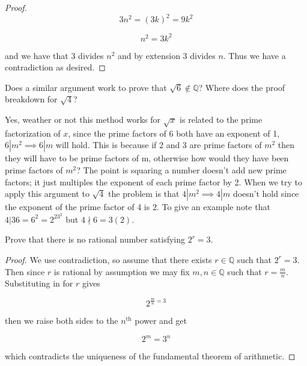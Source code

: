 \documentclass[11pt,largemargins]{homework}
\newcommand{\Q}{\mathbb{Q}}
\begin{document}
\begin{alphaparts}
\begin{proof}
                \begin{equation}
                     3n^2 = (3k)^2 = 9k^2
                \end{equation}
                
                \begin{equation}
                     n^2 = 3k^2 
                \end{equation}
                
                and we have that 3 divides $n^2$ and by extension 3 divides $n$. Thus we have a contradiction as desired.  
            \end{proof}
        \questionpart
            Does a similar argument work to prove that $\sqrt{6} \notin \Q$? Where does the proof breakdown for $\sqrt{4}$?
            
                Yes, weather or not this method works for $\sqrt{x}$ is related to the prime factorization of $x$, since the prime factors of 6 both have an exponent of 1, $6|m^2 \implies 6|m$ will hold. This is because if 2 and 3 are prime factors of $m^2$ then they will have to be prime factors of m, otherwise how would they have been prime factors of $m^2$? The point is squaring a number doesn't add new prime factors; it just multiples the exponent of each prime factor by 2. When we try to apply this argument to $\sqrt{4}$ the problem is that $4|m^2 \implies 4|m$ doesn't hold since the exponent of the prime factor of 4 is 2. To give an example note that $4|36 = 6^2 = 2^23^2$ but $4\nmid 6 = 3 (2) $. 
    \end{alphaparts}
    
    \question
    Prove that there is no rational number satisfying $2^r = 3$. 
    
    \begin{proof}
    We use contradiction, so assume that there exists $r \in \Q$ such that $2^r = 3$. Then since $r$ is rational by assumption we may fix $m, n \in \Q$ such that $r = \frac{m}{n}$. Substituting in for $r$ gives
    
    \[ 2^{\frac{m}{n} = 3} \] 
    
    then we raise both sides to the $n^{\text{th}}$ power and get 
    
    \[ 2^m = 3^n \] 
    
    which contradicts the uniqueness of the fundamental theorem of arithmetic. 
    \end{proof}
\end{document}
